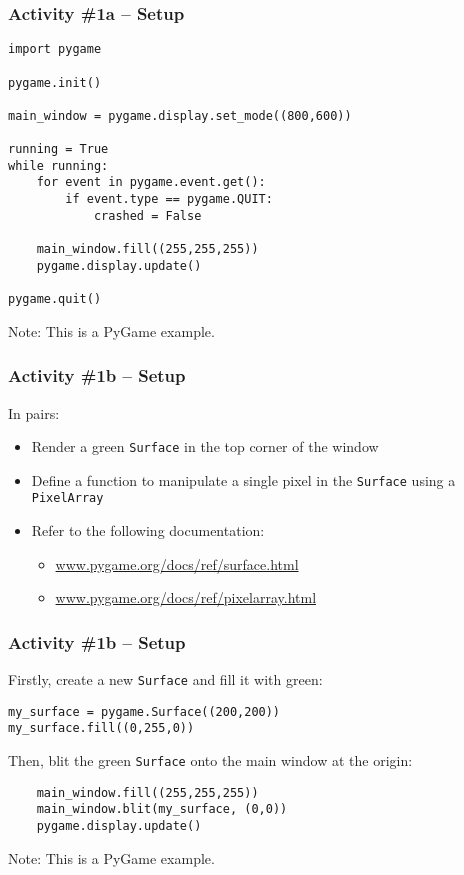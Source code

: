 \begin{frame}[fragile]
	\frametitle{Activity \#1a -- Setup}
	
\begin{lstlisting}
import pygame

pygame.init()

main_window = pygame.display.set_mode((800,600))

running = True
while running:
    for event in pygame.event.get():
        if event.type == pygame.QUIT:
            crashed = False

    main_window.fill((255,255,255))
    pygame.display.update()

pygame.quit()
\end{lstlisting}

Note: This is a PyGame example.

\end{frame}
	
\begin{frame}
	\frametitle{Activity \#1b -- Setup}
	
	In pairs:
	
	\vspace{2em}
	
	\begin{itemize}		
		\item Render a green \texttt{Surface} in the top corner of the window
		\item Define a function to manipulate a single pixel in the \texttt{Surface} using a \texttt{PixelArray}
		\item Refer to the following documentation:
		\begin{itemize}
			\item \url{www.pygame.org/docs/ref/surface.html}
			\item \url{www.pygame.org/docs/ref/pixelarray.html}
		\end{itemize}
	\end{itemize}
\end{frame}

\begin{frame}[fragile]
	\frametitle{Activity \#1b -- Setup}

Firstly, create a new \texttt{Surface} and fill it with green:
	
\begin{lstlisting}
my_surface = pygame.Surface((200,200))
my_surface.fill((0,255,0))
\end{lstlisting}

\vspace{0.5em}

Then, blit the green \texttt{Surface} onto the main window at the origin:

\begin{lstlisting}
    main_window.fill((255,255,255))
    main_window.blit(my_surface, (0,0))
    pygame.display.update()
\end{lstlisting}

Note: This is a PyGame example.

\end{frame}

